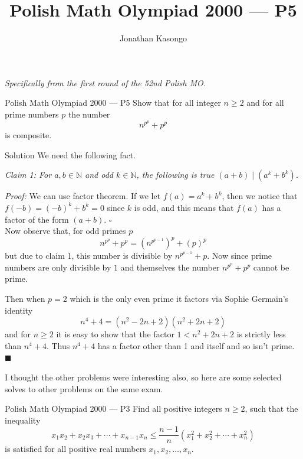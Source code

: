 \documentclass{article}
\author{Jonathan Kasongo}
\title{Polish Math Olympiad 2000 --- P5}
\begin{document}
\maketitle

\textit{Specifically from the first round of the 52nd Polish MO.}

\begin{problem}{Polish Math Olympiad 2000 --- P5}
Show that for all integer $n \geq 2$ and for all prime numbers $p$ the
number
$$
n^{p^p} + p^p
$$
is composite.
\end{problem}

\begin{solution}{Solution}
We need the following fact.\vspace{0.2cm}

\textit{Claim 1: For $a,b \in \mathbb{N}$ and odd $k \in \mathbb{N}$, the
following is true $(a + b) \mid (a^k + b^k)$.}\vspace{0.2cm}

\textit{Proof:} We can use factor theorem. If we let $f(a) = a^k + b^k$,
then we notice that $f(-b) = (-b)^k + b^k = 0$ since $k$ is odd, and this
means that $f(a)$ has a factor of the form $(a+b)$. $\square$
\\

Now observe that, for odd primes $p$
$$
n^{p^p} + p^p = \left( n^{p^{p-1}} \right)^p + (p)^p
$$
but due to claim 1, this number is divisible by
$n^{p^{p-1}} + p$. Now since prime numbers are only divisible by $1$ and
themselves the number $n^{p^p} + p^p$ cannot be prime.
\vspace{0.2cm}

Then when $p = 2$ which is the only even prime it factors via Sophie
Germain's identity
$$
n^4 + 4 = (n^2 - 2n + 2)(n^2 + 2n + 2)
$$
and for $n \geq 2$ it is easy to show that the factor $1 < n^2 + 2n + 2$ is
strictly less than $n^4 + 4$. Thus $n^4 + 4$ has a factor other than
1 and itself and so isn't prime.
$\blacksquare$
\end{solution}
\newpage

I thought the other problems were interesting also, so here are some
selected solves to other problems on the same exam.

\begin{problem}{Polish Math Olympiad 2000 --- P3}
Find all positive integers $n \geq 2$, such that the inequality
$$
x_1 x_2 + x_2 x_3 + \cdots + x_{n-1} x_n \leq
\frac{n-1}{n} \left( x_1^2 + x_2^2 + \cdots + x_n^2 \right)
$$
is satisfied for all positive real numbers $x_1, x_2, \ldots, x_n$.
\end{problem}
\end{document}
